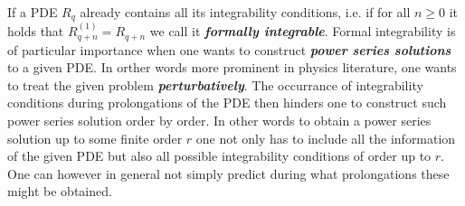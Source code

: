 \documentclass[a4paper,12pt, DIV=14, BCOR=5mm, twoside, headsepline]{scrbook}
\begin{document}
If a PDE $R_q$ already contains all its integrability conditions, i.e. if for all $n\geq 0$ it holds that $R_{q+n}^{(1)} = R_{q+n}$ we call it \textit{\textbf{formally integrable}}.
Formal integrability is of particular importance when one wants to construct \textbf{\textit{power series solutions}} to a given PDE. In orther words more prominent in physics literature, one wants to treat the given problem \textit{\textbf{perturbatively}}. The occurrance of integrability conditions during prolongations of the PDE then hinders one to construct such power series solution order by order. In other words to obtain a power series solution up to some finite order $r$ one not only has to include all the information of the given PDE but also all possible integrability conditions of order up to $r$. One can however in general not simply predict during what prolongations these might be obtained. 
\end{document}
